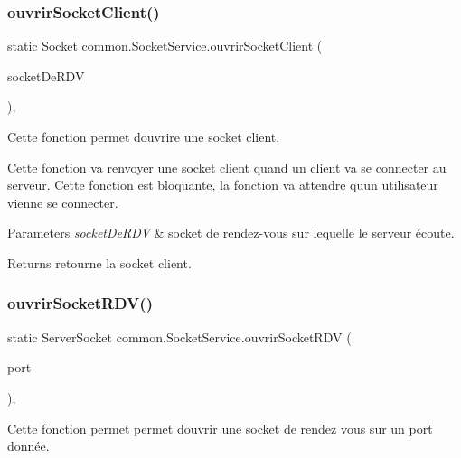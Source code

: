 \subsubsection{\texorpdfstring{ouvrir\+Socket\+Client()}{ouvrirSocketClient()}}
{\footnotesize\ttfamily static Socket common.\+Socket\+Service.\+ouvrir\+Socket\+Client (\begin{DoxyParamCaption}\item[{Server\+Socket}]{socket\+De\+R\+DV }\end{DoxyParamCaption})\hspace{0.3cm}{\ttfamily [inline]}, {\ttfamily [static]}}



Cette fonction permet d\textquotesingle{}ouvrire une socket client. 

Cette fonction va renvoyer une socket client quand un client va se connecter au serveur. Cette fonction est bloquante, la fonction va attendre qu\textquotesingle{}un utilisateur vienne se connecter. 
\begin{DoxyParams}{Parameters}
{\em socket\+De\+R\+DV} & socket de rendez-\/vous sur lequelle le serveur écoute. \\
\hline
\end{DoxyParams}
\begin{DoxyReturn}{Returns}
retourne la socket client. 
\end{DoxyReturn}
\mbox{\label{classcommon_1_1SocketService_a015867bbf56a89c3cd7a43a780f4147c}} 
\subsubsection{\texorpdfstring{ouvrir\+Socket\+R\+D\+V()}{ouvrirSocketRDV()}}
{\footnotesize\ttfamily static Server\+Socket common.\+Socket\+Service.\+ouvrir\+Socket\+R\+DV (\begin{DoxyParamCaption}\item[{int}]{port }\end{DoxyParamCaption})\hspace{0.3cm}{\ttfamily [inline]}, {\ttfamily [static]}}



Cette fonction permet permet d\textquotesingle{}ouvrir une socket de rendez vous sur un port donnée. 



